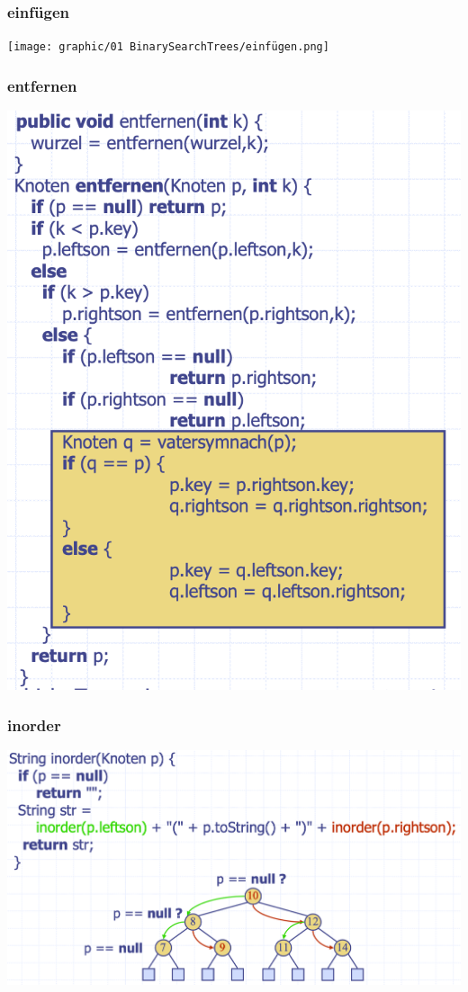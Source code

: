 \subsubsection{einfügen}
\begin{center}
    \texttt{[image: graphic/01 BinarySearchTrees/einfügen.png]}
\end{center}
\vspace{-12pt}

\subsubsection{entfernen}
\begin{center}
    \includegraphics[scale=.3]{graphic/01 BinarySearchTrees/entfernen.png}
\end{center}
\vspace{-8pt}

\subsubsection{inorder}
\begin{center}
    \includegraphics[scale=.22]{graphic/01 BinarySearchTrees/inorder().png}
\end{center}
\vspace{-8pt}




\newpage